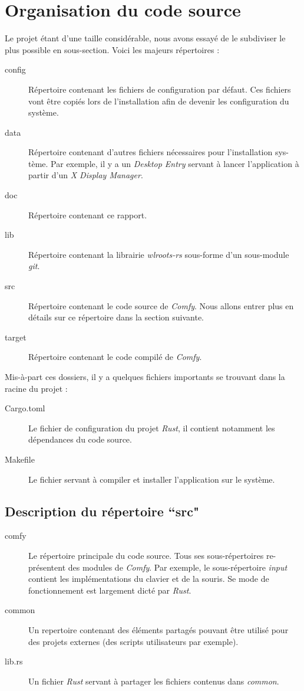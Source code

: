 \documentclass[titlepage]{article}
\begin{document}
\section{Organisation du code source}
Le projet étant d'une taille considérable, nous avons essayé de le subdiviser le plus possible en sous-section. Voici les majeurs répertoires :
\begin{description}
	\item [config] Répertoire contenant les fichiers de configuration par défaut. Ces fichiers vont être copiés lors de l'installation afin de devenir les configuration du système.
	\item [data] Répertoire contenant d'autres fichiers nécessaires pour l'installation sys-tème. Par exemple, il y a un \textit{Desktop Entry} servant à lancer l'application à partir d'un \textit{X Display Manager}.
	\item [doc] Répertoire contenant ce rapport.
	\item [lib] Répertoire contenant la librairie \textit{wlroots-rs} sous-forme d'un sous-module \textit{git}.
	\item [src] Répertoire contenant le code source de \textit{Comfy}. Nous allons entrer plus en détails sur ce répertoire dans la section suivante.
	\item [target] Répertoire contenant le code compilé de \textit{Comfy}.
\end{description}

Mis-à-part ces dossiers, il y a quelques fichiers importants se trouvant dans la racine du projet :
\begin{description}
	\item [Cargo.toml] Le fichier de configuration du projet \textit{Rust}, il contient notamment les dépendances du code source.
	\item [Makefile] Le fichier servant à compiler et installer l'application sur le système.
\end{description}
\subsection{Description du répertoire ``src"}
\begin{description}
	\item [comfy] Le répertoire principale du code source. Tous ses sous-répertoires re-présentent des modules de \textit{Comfy}. Par exemple, le sous-répertoire \textit{input} contient les implémentations du clavier et de la souris. Se mode de fonctionnement est largement dicté par \textit{Rust}.
	\item [common] Un repertoire contenant des éléments partagés pouvant être utilisé pour des projets externes (des scripts utilisateurs par exemple).
	\item [lib.rs] Un fichier \textit{Rust} servant à partager les fichiers contenus dans \textit{common}.
\end{description}
\end{document}
